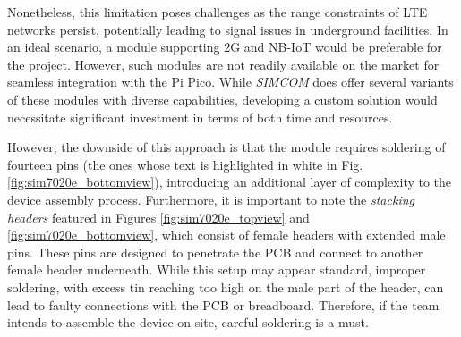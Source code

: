 Nonetheless, this limitation poses challenges as the range constraints of LTE networks persist, potentially leading to 
signal issues in underground facilities. In an ideal scenario, a module supporting 2G and NB-IoT would be preferable for 
the project. However, such modules are not readily available on the market for seamless integration with the Pi Pico. While 
\textit{SIMCOM} does offer several variants of these modules with diverse capabilities, developing a custom solution would 
necessitate significant investment in terms of both time and resources.

However, the downside of this approach is that the module requires soldering of fourteen pins (the ones whose text is 
highlighted in white in Fig. \ref{fig:sim7020e_bottomview}), introducing an additional layer of complexity to the device 
assembly process. Furthermore, it is important to note the \textit{stacking headers} featured in Figures 
\ref{fig:sim7020e_topview} and \ref{fig:sim7020e_bottomview}, which consist of female headers with extended male pins. These 
pins are designed to penetrate the PCB and connect to another female header underneath. While this setup may appear standard, 
improper soldering, with excess tin reaching too high on the male part of the header, can lead to faulty connections with the 
PCB or breadboard. Therefore, if the team intends to assemble the device on-site, careful soldering is a must.

